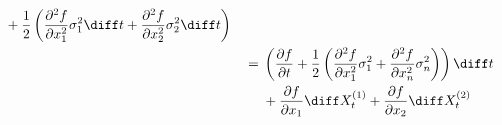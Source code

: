 \begin{subproblem}[(\alph*)]
\begin{equation}
\begin{aligned}
\begin{aligned}[t]
            &+\frac{1}{2}\left(
                \frac{\partial^2 f}{\partial x_1^2}\sigma_1^2\diff t
                +\frac{\partial^2 f}{\partial x_2^2}\sigma_2^2\diff t
            \right)
            \end{aligned}\\
            &=\begin{aligned}[t]
            &\left(
                \frac{\partial f}{\partial t}+     
                \frac{1}{2}\left(
                \frac{\partial^2 f}{\partial x_1^2}\sigma_1^2
                +\frac{\partial^2 f}{\partial x_n^2}\sigma_n^2
                \right)
            \right)\diff t\\
            &+\frac{\partial f}{\partial x_1}\diff X_t^{(1)}
            +\frac{\partial f}{\partial x_2}\diff X_t^{(2)}
            \end{aligned}
            \end{aligned}
        \end{equation}


\end{subproblem}
